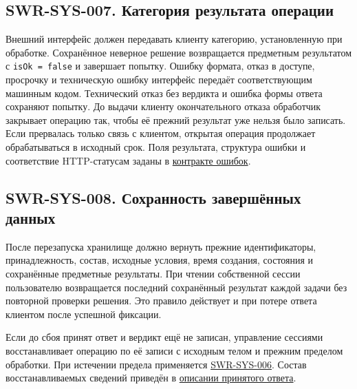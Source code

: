 \documentclass[12pt,a4paper]{article}
\begin{document}
\subsection{SWR-SYS-007. Категория результата операции}\label{swr-sys-007-ux43aux430ux442ux435ux433ux43eux440ux438ux44f-ux440ux435ux437ux443ux43bux44cux442ux430ux442ux430-ux43eux43fux435ux440ux430ux446ux438ux438}

\hypertarget{swr-sys-007-категория-результата-операции}{}

\hypertarget{swr-sys-007}{}

Внешний интерфейс должен передавать клиенту категорию, установленную при обработке. Сохранённое неверное решение возвращается предметным результатом с \texttt{is\allowbreak{}Ok =\allowbreak{} false} и завершает попытку. Ошибку формата, отказ в доступе, просрочку и техническую ошибку интерфейс передаёт соответствующим машинным кодом. Технический отказ без вердикта и ошибка формы ответа сохраняют попытку. До выдачи клиенту окончательного отказа обработчик закрывает операцию так, чтобы её прежний результат уже нельзя было записать. Если прервалась только связь с клиентом, открытая операция продолжает обрабатываться в исходный срок. Поля результата, структура ошибки и соответствие HTTP-статусам заданы в {\href{DOC-06.2\_Сессии\_задач\_и\_планировщик.pdf\#коды-и-представление-ошибок}{контракте ошибок}}.

\subsection{SWR-SYS-008. Сохранность завершённых данных}\label{swr-sys-008-ux441ux43eux445ux440ux430ux43dux43dux43eux441ux442ux44c-ux437ux430ux432ux435ux440ux448ux451ux43dux43dux44bux445-ux434ux430ux43dux43dux44bux445}

\hypertarget{swr-sys-008-сохранность-завершённых-данных}{}

\hypertarget{swr-sys-008}{}

После перезапуска хранилище должно вернуть прежние идентификаторы, принадлежность, состав, исходные условия, время создания, состояния и сохранённые предметные результаты. При чтении собственной сессии пользователю возвращается последний сохранённый результат каждой задачи без повторной проверки решения. Это правило действует и при потере ответа клиентом после успешной фиксации.

Если до сбоя принят ответ и вердикт ещё не записан, управление сессиями восстанавливает операцию по её записи с исходным телом и прежним пределом обработки. При истечении предела применяется {\hyperlink{swr-sys-006}{SWR-SYS-006}}. Состав восстанавливаемых сведений приведён в {\hyperlink{данные-принятого-ответа}{описании принятого ответа}}.
\end{document}
